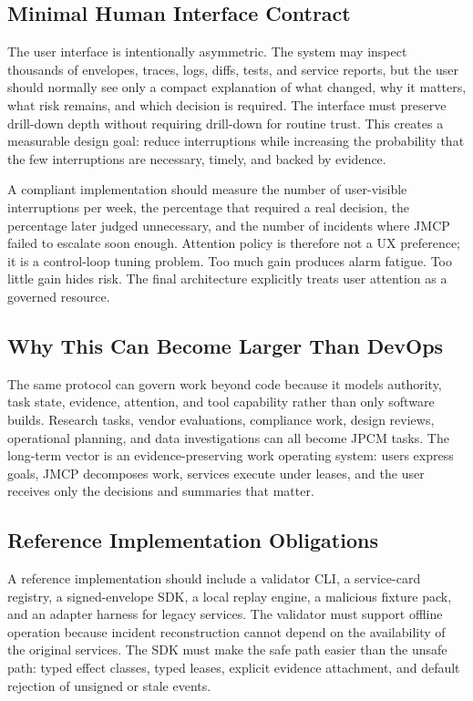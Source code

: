 \documentclass[10pt,journal,onecolumn]{IEEEtran}
\begin{document}
\subsection{Minimal Human Interface Contract}
The user interface is intentionally asymmetric. The system may inspect thousands of envelopes, traces, logs, diffs, tests, and service reports, but the user should normally see only a compact explanation of what changed, why it matters, what risk remains, and which decision is required. The interface must preserve drill-down depth without requiring drill-down for routine trust. This creates a measurable design goal: reduce interruptions while increasing the probability that the few interruptions are necessary, timely, and backed by evidence.

A compliant implementation should measure the number of user-visible interruptions per week, the percentage that required a real decision, the percentage later judged unnecessary, and the number of incidents where JMCP failed to escalate soon enough. Attention policy is therefore not a UX preference; it is a control-loop tuning problem. Too much gain produces alarm fatigue. Too little gain hides risk. The final architecture explicitly treats user attention as a governed resource.

\subsection{Why This Can Become Larger Than DevOps}
The same protocol can govern work beyond code because it models authority, task state, evidence, attention, and tool capability rather than only software builds. Research tasks, vendor evaluations, compliance work, design reviews, operational planning, and data investigations can all become JPCM tasks. The long-term vector is an evidence-preserving work operating system: users express goals, JMCP decomposes work, services execute under leases, and the user receives only the decisions and summaries that matter.


\subsection{Reference Implementation Obligations}
A reference implementation should include a validator CLI, a service-card registry, a signed-envelope SDK, a local replay engine, a malicious fixture pack, and an adapter harness for legacy services. The validator must support offline operation because incident reconstruction cannot depend on the availability of the original services. The SDK must make the safe path easier than the unsafe path: typed effect classes, typed leases, explicit evidence attachment, and default rejection of unsigned or stale events.
\end{document}
